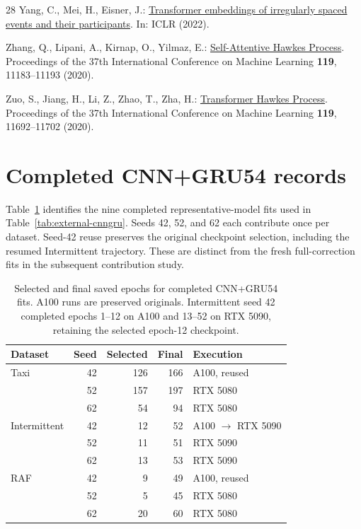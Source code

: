 \documentclass[runningheads]{llncs}
\begin{document}
\begin{thebibliography}{28}
Yang, C., Mei, H., Eisner, J.:
\href{https://www.cs.jhu.edu/~jason/papers/yang+al.iclr22.pdf}{Transformer embeddings of irregularly spaced events and their participants}. In: ICLR (2022).

Zhang, Q., Lipani, A., Kirnap, O., Yilmaz, E.: \href{https://proceedings.mlr.press/v119/zhang20q.html}{Self-Attentive Hawkes Process}. Proceedings of the 37th International Conference on Machine Learning \textbf{119}, 11183--11193 (2020).

Zuo, S., Jiang, H., Li, Z., Zhao, T., Zha, H.: \href{https://proceedings.mlr.press/v119/zuo20a.html}{Transformer Hawkes Process}. Proceedings of the 37th International Conference on Machine Learning \textbf{119}, 11692--11702 (2020).
\end{thebibliography}

\clearpage
\appendix
\renewcommand{\theHsection}{\Alph{section}}
\section{Completed CNN+GRU54 records}
\label{app:cnngru-records}
Table~\ref{tab:cnngru-epochs} identifies the nine completed representative-model fits used in Table~\ref{tab:external-cnngru}. Seeds 42, 52, and 62 each contribute once per dataset. Seed-42 reuse preserves the original checkpoint selection, including the resumed Intermittent trajectory. These are distinct from the fresh full-correction fits in the subsequent contribution study.

\begin{table}[htbp]
\caption{Selected and final saved epochs for completed CNN+GRU54 fits. A100 runs are preserved originals. Intermittent seed 42 completed epochs 1--12 on A100 and 13--52 on RTX 5090, retaining the selected epoch-12 checkpoint.}
\label{tab:cnngru-epochs}
\centering\small
\begin{tabular}{@{}lrrrl@{}}
\toprule
Dataset & Seed & Selected & Final & Execution\\
\midrule
Taxi & 42 & 126 & 166 & A100, reused\\
 & 52 & 157 & 197 & RTX 5080\\
 & 62 & 54 & 94 & RTX 5080\\
\midrule
Intermittent & 42 & 12 & 52 & A100 $\to$ RTX 5090\\
 & 52 & 11 & 51 & RTX 5090\\
 & 62 & 13 & 53 & RTX 5090\\
\midrule
RAF & 42 & 9 & 49 & A100, reused\\
 & 52 & 5 & 45 & RTX 5080\\
 & 62 & 20 & 60 & RTX 5080\\
\bottomrule
\end{tabular}
\end{table}
\end{document}
